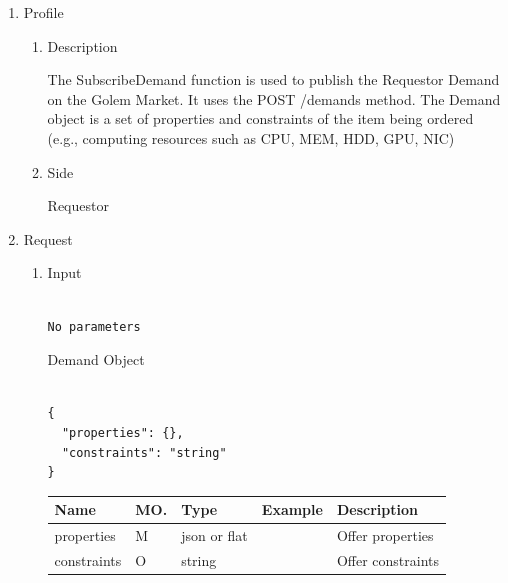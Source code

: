 \begin{enumerate}

\item Profile

\begin{enumerate}

\item Description

The SubscribeDemand function is used to publish the Requestor Demand on the Golem Market. It uses the POST /demands method.
The Demand object is a set of properties and constraints of the item being ordered (e.g., computing resources such as CPU, MEM, HDD, GPU, NIC)

\item Side

Requestor

\end{enumerate}

\item Request

\begin{enumerate}

\item Input

\begin{tcolorbox}[boxrule=0pt, frame empty]
\begin{verbatim}

No parameters

\end{verbatim}
\end{tcolorbox}

Demand Object

\begin{tcolorbox}[boxrule=0pt, frame empty]
\begin{verbatim}

{
  "properties": {},
  "constraints": "string"
}

\end{verbatim}
\end{tcolorbox}

\begin{center}
\begin{tabular}{|p{3cm}|l|p{3cm}|p{3cm}|p{4cm}|} 
\hline
\rowcolor{lightgray}	Name	& MO.	& Type	& Example & 	Description \\
\hline

properties	& M	& 	json or flat	&		&	Offer properties \\ 

\hline

constraints	& O	& 	string	&		&	Offer constraints \\ 


\end{tabular}
\end{center}
\end{enumerate}
\end{enumerate}
